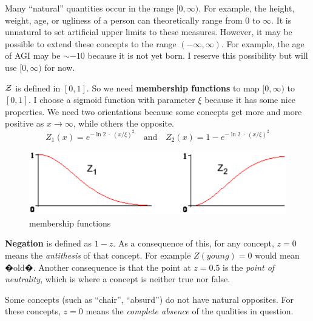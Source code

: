 Many ``natural'' quantities occur in the range $[0,\infty)$.  For example, the height, weight, age, or ugliness of a person can theoretically range from 0 to $\infty$.  It is unnatural to set artificial upper limits to these measures.  However, it may be possible to extend these concepts to the range $(-\infty,\infty)$.  For example, the age of AGI may be $\sim-10$ because it is not yet born.  I reserve this possibility but will use $[0,\infty)$ for now.

$\mathcal{Z}$ is defined in $[0,1]$.  So we need \textbf{membership functions} to map $[0,\infty)$ to $[0,1]$.  I choose a sigmoid function with parameter $\xi$ because it has some nice properties.  We need two orientations because some concepts get more and more positive as $x \rightarrow \infty$, while others the opposite.
\begin{equation}
\label{eqn:Z-squashing-fns}
Z_1(x) = e^{-\ln 2 \; \cdot \; (x/\xi)^2} \quad \mbox{and} \quad Z_2(x) = 1-e^{- \ln 2 \; \cdot \; (x/\xi)^2} 
\end{equation}
\begin{figure}[H]
\centering
\includegraphics[scale=0.9]{MappingFunctions.png}
\caption{membership functions}
\end{figure}

\textbf{Negation} is defined as $1-z$.  As a consequence of this, for any concept, $z = 0$ means the \textit{antithesis} of that concept.  For example $Z(young) = 0$ would mean �old�. Another consequence is that the point at $z = 0.5$ is the \textit{point of neutrality}, which is where a concept is neither true nor false.

Some concepts (such as ``chair'', ``absurd'') do not have natural opposites.  For these concepts, $z = 0$ means the \textit{complete absence} of the qualities in question.


